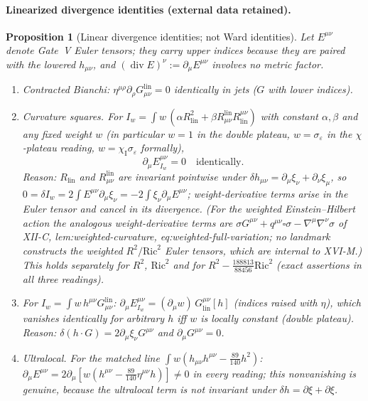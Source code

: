 \documentclass{article}
\newtheorem{proposition}{Proposition}
\theoremstyle{remark}
\newcommand{\sigeps}{\sigma_\varepsilon}
\newcommand{\chiI}{\chi_{\mathrm I}}
\begin{document}
\paragraph{Linearized divergence identities (external data retained).}
\begin{proposition}[Linear divergence identities; not Ward identities]
\label{prop:M7-id}
Let $E^{\mu\nu}$ denote Gate~V Euler tensors; they carry \emph{upper} indices because they are paired with the lowered $h_{\mu\nu}$, and $(\operatorname{div}E)^\nu:=\partial_\mu E^{\mu\nu}$ involves no metric factor.
\begin{enumerate}
\item[(A)] Contracted Bianchi: $\eta^{\mu\rho}\partial_\rho G^{\mathrm{lin}}_{\mu\nu}=0$ identically in jets ($G$ with lower indices).
\item[(B$'$)] \emph{Curvature squares.} For $I_w=\int w\,(\alpha R_{\mathrm{lin}}^2+\beta R^{\mathrm{lin}}_{\mu\nu}R_{\mathrm{lin}}^{\mu\nu})$ with constant $\alpha,\beta$ and \emph{any} fixed weight $w$ (in particular $w=1$ in the double plateau, $w=\sigeps$ in the $\chi$-plateau reading, $w=\chiI\sigeps$ formally),
\[
\partial_\mu E_{I_w}^{\mu\nu}=0\quad\text{identically.}
\]
Reason: $R_{\mathrm{lin}}$ and $R^{\mathrm{lin}}_{\mu\nu}$ are invariant \emph{pointwise} under $\delta h_{\mu\nu}=\partial_\mu\xi_\nu+\partial_\nu\xi_\mu$, so $0=\delta I_w=2\int E^{\mu\nu}\partial_\mu\xi_\nu=-2\int\xi_\nu\partial_\mu E^{\mu\nu}$; weight-derivative terms arise in the Euler tensor and cancel in its divergence.
(For the weighted Einstein--Hilbert action the analogous weight-derivative terms are $\sigma G^{\mu\nu}+q^{\mu\nu}\square\sigma-\nabla^\mu\nabla^\nu\sigma$ of XII-C, lem:weighted-curvature, eq:weighted-full-variation; no landmark constructs the weighted $R^2/\mathrm{Ric}^2$ Euler tensors, which are internal to XVI-M.)
This holds separately for $R^2$, $\mathrm{Ric}^2$ and for $R^2-\tfrac{188813}{88456}\mathrm{Ric}^2$ (exact assertions in all three readings).
\item[(EH)] For $I_w=\int w\,h^{\mu\nu}G^{\mathrm{lin}}_{\mu\nu}$: $\partial_\mu E_{I_w}^{\mu\nu}=(\partial_\mu w)\,G_{\mathrm{lin}}^{\mu\nu}[h]$ (indices raised with $\eta$), which vanishes identically for arbitrary $h$ iff $w$ is locally constant (double plateau).
Reason: $\delta(h\cdot G)=2\partial_\mu\xi_\nu G^{\mu\nu}$ and $\partial_\mu G^{\mu\nu}=0$.
\item[(B)] \emph{Ultralocal.} For the matched line $\int w(h_{\mu\nu}h^{\mu\nu}-\tfrac{89}{140}h^2)$: $\partial_\mu E^{\mu\nu}=2\partial_\mu[w(h^{\mu\nu}-\tfrac{89}{140}\eta^{\mu\nu}h)]\ne0$ in every reading; this nonvanishing is genuine, because the ultralocal term is not invariant under $\delta h=\partial\xi+\partial\xi$.

\end{enumerate}
\end{proposition}
\end{document}
